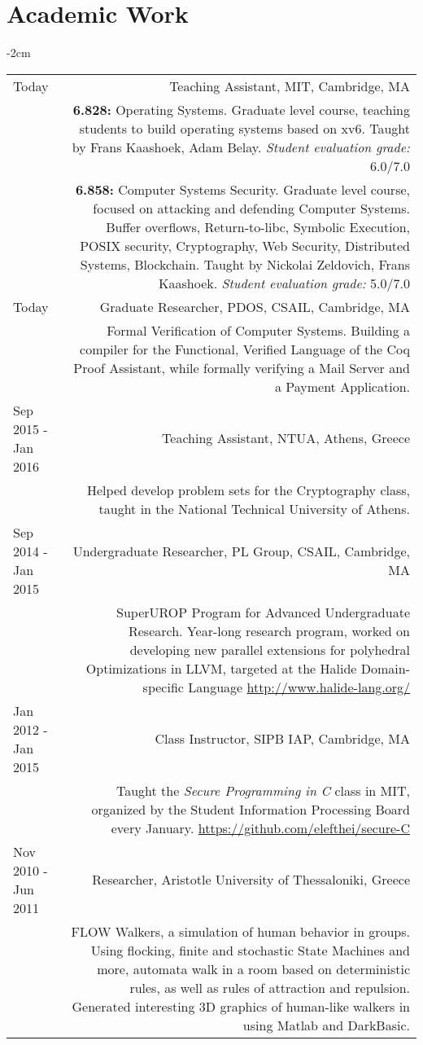 \documentclass[lettersize,10pt]{article}
\begin{document}
\section{Academic Work}
\begin{adjustwidth}{}{-2cm}
  \begin{tabularx}{\textwidth}{L R}
	Today & {\sc Teaching Assistant, MIT}, Cambridge, MA \\
	& \textbf{6.828:} Operating Systems. Graduate level course, teaching students to build operating systems based on xv6.
	Taught by Frans Kaashoek, Adam Belay. \emph{Student evaluation grade:} 6.0/7.0 \\
	& \textbf{6.858:} Computer Systems Security. Graduate level course, focused on attacking and defending Computer Systems.
	Buffer overflows, Return-to-libc, Symbolic Execution, POSIX security, Cryptography, Web Security, Distributed Systems, Blockchain.
	Taught by Nickolai Zeldovich, Frans Kaashoek. \emph{Student evaluation grade:} 5.0/7.0 \\

    Today & {\sc Graduate Researcher, PDOS, CSAIL}, Cambridge, MA \\
    & Formal Verification of Computer Systems. Building a compiler for
    the Functional, Verified Language of the Coq Proof Assistant, while formally verifying a Mail Server and a Payment Application. \\

	Sep 2015 - Jan 2016 & {\sc Teaching Assistant, NTUA}, Athens, Greece \\
	& Helped develop problem sets for the Cryptography class, taught in the National Technical University of Athens. \\

    Sep 2014 - Jan 2015 & {\sc Undergraduate Researcher, PL Group, CSAIL}, Cambridge, MA \\
    & SuperUROP Program for Advanced Undergraduate Research. Year-long research program, worked on developing new parallel extensions for
	polyhedral Optimizations in LLVM, targeted at the Halide Domain-specific Language \url{http://www.halide-lang.org/} \\

	Jan 2012 - Jan 2015 & {\sc Class Instructor, SIPB IAP}, Cambridge, MA \\
	& Taught the \emph{Secure Programming in C} class in MIT, organized by the Student Information Processing Board every January.
    \url{https://github.com/elefthei/secure-C} \\

    Nov 2010 - Jun 2011 & {\sc Researcher, Aristotle University of Thessaloniki}, Greece \\
    &  FLOW Walkers, a simulation of human behavior in groups. Using flocking, finite and stochastic State Machines and more, automata walk
    in a room based on deterministic rules, as well as rules of attraction and repulsion. Generated interesting
    3D graphics of human-like walkers in using Matlab and DarkBasic. \\
  \end{tabularx}
\end{adjustwidth}
\end{document}
